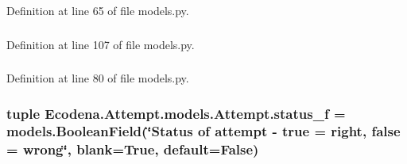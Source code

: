 Definition at line 65 of file models.py.

\hypertarget{class_ecodena_1_1_attempt_1_1models_1_1_attempt_a8cadfc3c3993ddedf4f8a49e67b71e19}{
\subsubsection[{solution\_\-f}]{}}
\label{d5/da0/class_ecodena_1_1_attempt_1_1models_1_1_attempt_a8cadfc3c3993ddedf4f8a49e67b71e19}


Definition at line 107 of file models.py.

\hypertarget{class_ecodena_1_1_attempt_1_1models_1_1_attempt_aa0e8d9e10aa7d394777a8dcc138b67bf}{
\subsubsection[{status\_\-f}]{}}
\label{d5/da0/class_ecodena_1_1_attempt_1_1models_1_1_attempt_aa0e8d9e10aa7d394777a8dcc138b67bf}


Definition at line 80 of file models.py.

\hypertarget{class_ecodena_1_1_attempt_1_1models_1_1_attempt_a59ab4c46b6d8e82311f400a9f86398f3}{
\subsubsection[{status\_\-f}]{\setlength{\rightskip}{0pt plus 5cm}tuple {\bf Ecodena.Attempt.models.Attempt.status\_\-f} = models.BooleanField(\char`\"{}Status of attempt -\/ true = right, false = wrong\char`\"{}, blank=True, default=False)}}
\label{d5/da0/class_ecodena_1_1_attempt_1_1models_1_1_attempt_a59ab4c46b6d8e82311f400a9f86398f3}


